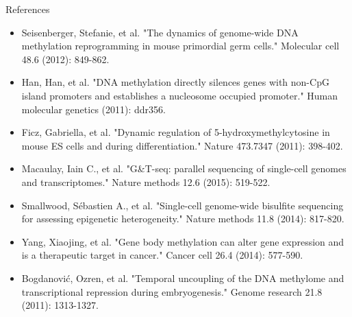 \documentclass[10pt, compress]{beamer}
\renewcommand{\(}{\begin{columns}}
\renewcommand{\)}{\end{columns}}
\newcommand{\<}[1]{\begin{column}{#1}}
\renewcommand{\>}{\end{column}}
\begin{document}
\begin{frame}[fragile]
	\centering \Large {References}
	\footnotesize
	\begin{itemize}
		\item Seisenberger, Stefanie, et al. "The dynamics of genome-wide DNA methylation reprogramming in mouse primordial germ cells." Molecular cell 48.6 (2012): 849-862.
		\item Han, Han, et al. "DNA methylation directly silences genes with non-CpG island promoters and establishes a nucleosome occupied promoter." Human molecular genetics (2011): ddr356.
		\item Ficz, Gabriella, et al. "Dynamic regulation of 5-hydroxymethylcytosine in mouse ES cells and during differentiation." Nature 473.7347 (2011): 398-402. 
		\item Macaulay, Iain C., et al. "G\&T-seq: parallel sequencing of single-cell genomes and transcriptomes." Nature methods 12.6 (2015): 519-522.
		\item Smallwood, Sébastien A., et al. "Single-cell genome-wide bisulfite sequencing for assessing epigenetic heterogeneity." Nature methods 11.8 (2014): 817-820.
		\item Yang, Xiaojing, et al. "Gene body methylation can alter gene expression and is a therapeutic target in cancer." Cancer cell 26.4 (2014): 577-590.
		\item Bogdanović, Ozren, et al. "Temporal uncoupling of the DNA methylome and transcriptional repression during embryogenesis." Genome research 21.8 (2011): 1313-1327.
	\end{itemize}
\end{frame}
\end{document}
